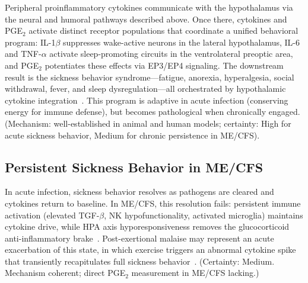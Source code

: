 \begin{hypothesis}
\label{hyp:ch15-sickness-cytokine-PGE2}
Peripheral proinflammatory cytokines communicate with the hypothalamus via the neural and humoral pathways described above. Once there, cytokines and PGE$_2$ activate distinct receptor populations that coordinate a unified behavioral program: IL-1$\beta$ suppresses wake-active neurons in the lateral hypothalamus, IL-6 and TNF-$\alpha$ activate sleep-promoting circuits in the ventrolateral preoptic area, and PGE$_2$ potentiates these effects via EP3/EP4 signaling. The downstream result is the sickness behavior syndrome---fatigue, anorexia, hyperalgesia, social withdrawal, fever, and sleep dysregulation---all orchestrated by hypothalamic cytokine integration~\cite{Dantzer2008inflammation, Dantzer2007twenty}. This program is adaptive in acute infection (conserving energy for immune defense), but becomes pathological when chronically engaged.
(Mechanism: well-established in animal and human models; certainty: High for acute sickness behavior, Medium for chronic persistence in ME/CFS).
\end{hypothesis}

\subsection{Persistent Sickness Behavior in ME/CFS}

\begin{hypothesis}
\label{hyp:ch15-sickness-persistence}
In acute infection, sickness behavior resolves as pathogens are cleared and cytokines return to baseline. In ME/CFS, this resolution fails: persistent immune activation (elevated TGF-$\beta$, NK hypofunctionality, activated microglia) maintains cytokine drive, while HPA axis hyporesponsiveness removes the glucocorticoid anti-inflammatory brake~\cite{Morris2013sickness}. Post-exertional malaise may represent an acute exacerbation of this state, in which exercise triggers an abnormal cytokine spike that transiently recapitulates full sickness behavior~\cite{Dantzer2007twenty, Morris2013sickness}.
(Certainty: Medium. Mechanism coherent; direct PGE$_2$ measurement in ME/CFS lacking.)
\end{hypothesis}


